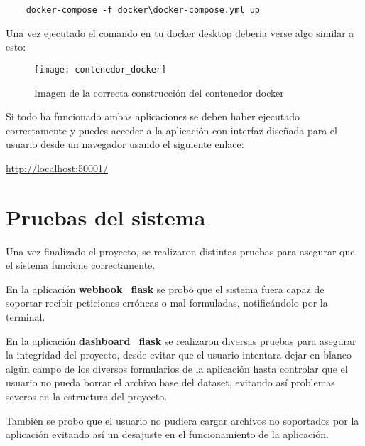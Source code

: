 \begin{verbatim}
    docker-compose -f docker\docker-compose.yml up
\end{verbatim}

Una vez ejecutado el comando en tu docker desktop deberia verse algo similar a esto:

\begin{figure}
    \centering
    \texttt{[image: contenedor\_docker]} 
    \caption{Imagen de la correcta construcción del contenedor docker}
\end{figure}

Si todo ha funcionado ambas aplicaciones se deben haber ejecutado correctamente y puedes acceder a la aplicación con interfaz diseñada para el usuario desde un navegador usando el siguiente enlace:

\href{http://localhost:5001/}{http://localhost:50001/}


\section{Pruebas del sistema}
Una vez finalizado el proyecto, se realizaron distintas pruebas para asegurar que el sistema funcione correctamente.

En la aplicación \textbf{webhook\_flask} se probó que el sistema fuera capaz de soportar recibir peticiones erróneas o mal formuladas, notificándolo por la terminal.

En la aplicación \textbf{dashboard\_flask} se realizaron diversas pruebas para asegurar la integridad del proyecto, desde evitar que el usuario intentara dejar en blanco algún campo de los diversos formularios de la aplicación hasta controlar que el usuario no pueda borrar el archivo base del dataset, evitando así problemas severos en la estructura del proyecto.

También se probo que el usuario no pudiera cargar archivos no soportados por la aplicación evitando así un desajuste en el funcionamiento de la aplicación.




